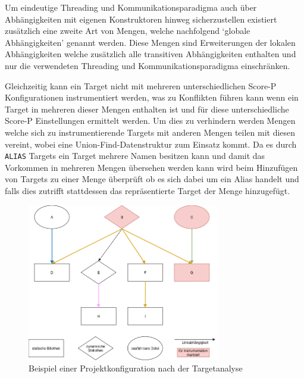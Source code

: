 \documentclass[german,proseminar,hyperref,utf8,lof]{zihpub}
\begin{document}
    Um eindeutige Threading und Kommunikationsparadigma auch über Abhängigkeiten mit eigenen
    Konstruktoren hinweg sicherzustellen existiert zusätzlich eine zweite Art von Mengen, welche
    nachfolgend `globale Abhängigkeiten' genannt werden.
    Diese Mengen sind Erweiterungen der lokalen Abhängigkeiten welche zusätzlich alle transitiven
    Abhängigkeiten enthalten und nur die verwendeten Threading und Kommunikationsparadigma einschränken.

    Gleichzeitig kann ein Target nicht mit mehreren unterschiedlichen Score-P Konfigurationen
    instrumentiert werden, was zu Konflikten führen kann wenn ein Target in mehreren dieser
    Mengen enthalten ist und für diese unterschiedliche Score-P Einstellungen ermittelt werden.
    Um dies zu verhindern werden Mengen welche sich zu instrumentierende Targets mit anderen
    Mengen teilen mit diesen vereint, wobei eine Union-Find-Datenstruktur zum Einsatz kommt.
    Da es durch \texttt{ALIAS} Targets ein Target mehrere Namen besitzen kann und damit das Vorkommen
    in mehreren Mengen übersehen werden kann wird beim Hinzufügen von Targets zu einer Menge überprüft
    ob es sich dabei um ein Alias handelt und falls dies zutrifft stattdessen das repräsentierte Target
    der Menge hinzugefügt.

    \begin{figure}
        \begin{center}
            \includegraphics[width=0.75\textwidth]{analysis_localsets.drawio.png}
            \caption{Beispiel einer Projektkonfiguration nach der Targetanalyse}
            \label{fig:analysis_localsets}
        \end{center}
    \end{figure}
\end{document}
